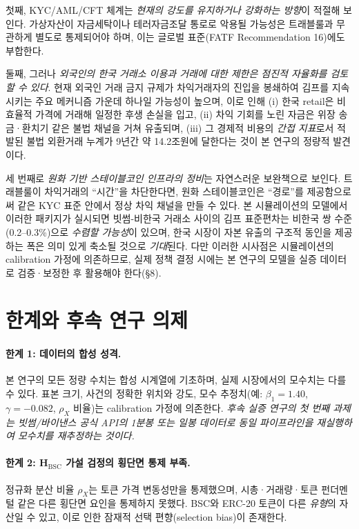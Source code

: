 \documentclass[11pt,a4paper]{article}
\begin{document}
첫째, KYC/AML/CFT 체계는 \emph{현재의 강도를 유지하거나 강화하는 방향}이 적절해 보인다.
가상자산이 자금세탁이나 테러자금조달 통로로 악용될 가능성은 트래블룰과 무관하게 별도로
통제되어야 하며, 이는 글로벌 표준(FATF Recommendation 16)에도 부합한다.

둘째, 그러나 \emph{외국인의 한국 거래소 이용과 거래에 대한 제한은 점진적 자율화를 검토할
수 있다}. 현재 외국인 거래 금지 규제가 차익거래자의 진입을 봉쇄하여 김프를 지속시키는
주요 메커니즘 가운데 하나일 가능성이 높으며, 이로 인해 (i) 한국 retail은 비효율적
가격에 거래해 일정한 후생 손실을 입고, (ii) 차익 기회를 노린 자금은 위장 송금·환치기 같은
불법 채널을 거쳐 유출되며, (iii) 그 경제적 비용의 \emph{간접 지표}로서 적발된 불법
외환거래 누계가 9년간 약 14.2조원에 달한다는 것이 본 연구의 정량적 발견이다.

세 번째로 \emph{원화 기반 스테이블코인 인프라의 정비}는 자연스러운 보완책으로 보인다.
트래블룰이 차익거래의 ``시간''을 차단한다면, 원화 스테이블코인은 ``경로''를 제공함으로써
같은 KYC 표준 안에서 정상 차익 채널을 만들 수 있다. 본 시뮬레이션의 모델에서
이러한 패키지가 실시되면 빗썸-비한국 거래소 사이의 김프 표준편차는 비한국 쌍 수준
(0.2--0.3\%)으로 \emph{수렴할 가능성}이 있으며, 한국 시장이 자본 유출의 구조적 동인을
제공하는 폭은 의미 있게 축소될 것으로 \emph{기대}된다. 다만 이러한 시사점은
시뮬레이션의 calibration 가정에 의존하므로, 실제 정책 결정 시에는 본 연구의 모델을
실증 데이터로 검증·보정한 후 활용해야 한다(\S8).

\section{한계와 후속 연구 의제}

\paragraph{한계 1: 데이터의 합성 성격.}
본 연구의 모든 정량 수치는 합성 시계열에 기초하며, 실제 시장에서의 모수치는 다를 수 있다.
표본 크기, 사건의 정확한 위치와 강도, 모수 추정치(예: $\beta_1=1.40$, $\gamma=-0.082$,
$\rho_X$ 비율)는 calibration 가정에 의존한다. \emph{후속 실증 연구의 첫 번째 과제는 빗썸/바이낸스
공식 API의 1분봉 또는 일봉 데이터로 동일 파이프라인을 재실행하여 모수치를 재추정하는 것이다.}

\paragraph{한계 2: H$_{\text{BSC}}$ 가설 검정의 횡단면 통제 부족.}
정규화 분산 비율 $\rho_X$는 토큰 가격 변동성만을 통제했으며, 시총·거래량·토큰 펀더멘털 같은
다른 횡단면 요인을 통제하지 못했다. BSC와 ERC-20 토큰이 다른 \emph{유형}의 자산일 수 있고,
이로 인한 잠재적 선택 편향(selection bias)이 존재한다.
\end{document}
